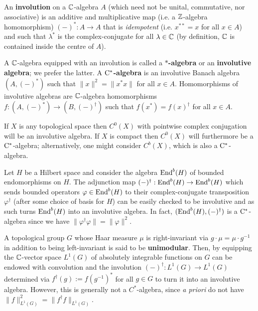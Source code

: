        \begin{definition} \label{def: involutions}
            An \textbf{involution} on a $\mathbb{C}$-algebra $A$ (which need not be unital, commutative, nor associative) is an additive and multiplicative map (i.e. a $\mathbb{Z}$-algebra homomorphism) $(-)^*: A \to A$ that is \textit{idempotent} (i.e. $x^{**} = x$ for all $x \in A$) and such that $\lambda^*$ is the complex-conjugate for all $\lambda \in \mathbb{C}$ (by definition, $\mathbb{C}$ is contained inside the centre of $A$).
            
            A $\mathbb{C}$-algebra equipped with an involution is called a \textbf{$*$-algebra} or an \textbf{involutive algebra}; we prefer the latter. A \textbf{$\mathrm{C}^*$-algebra} is an involutive Banach algebra $(A, (-)^*)$ such that $\|x\|^2 = \|x^* x\|$ for all $x \in A$. Homomorphisms of involutive algebras are $\mathbb{C}$-algebra homomorphisms $f: (A, (-)^*) \to (B, (-)^{\dagger})$ such that $f(x^*) = f(x)^{\dagger}$ for all $x \in A$.
        \end{definition}
        \begin{example} \label{example: continuous_functions_with_complex_conjugation}
            If $X$ is any topological space then $C^0(X)$ with pointwise complex conjugation will be an involutive algebra. If $X$ is compact then $C^0(X)$ will furthermore be a $\mathrm{C}^*$-algebra; alternatively, one might consider $C^b(X)$, which is also a $\mathrm{C}^*$-algebra.
        \end{example}
        \begin{example}
            Let $H$ be a Hilbert space and consider the algebra $\mathrm{End}^b(H)$ of bounded endomorphisms on $H$. The adjunction map $(-)^{\dagger}: \mathrm{End}^b(H) \to \mathrm{End}^b(H)$ which sends bounded operators $\varphi \in \mathrm{End}^b(H)$ to their complex-conjugate transposition $\varphi^{\dagger}$ (after some choice of basis for $H$) can be easily checked to be involutive and as such turns $\mathrm{End}^b(H)$ into an involutive algebra. In fact, $(\mathrm{End}^b(H), (-)^{\dagger})$ is a $\mathrm{C}^*$-algebra since we have $\|\varphi^{\dagger} \varphi\| = \|\varphi\|^2$.
        \end{example}
        \begin{example} 
            A topological group $G$ whose Haar measure $\mu$ is right-invariant via $g \cdot \mu = \mu \cdot g^{-1}$ in addition to being left-invariant is said to be \textbf{unimodular}. Then, by equipping the $\mathbb{C}$-vector space $L^1(G)$ of absolutely integrable functions on $G$ can be endowed with convolution and the involution $(-)^{\dagger}: L^1(G) \to L^1(G)$ determined via $f^{\dagger}(g) := f(g^{-1})^*$ for all $g \in G$ to turn it into an involutive algebra. However, this is generally not a $C^*$-algebra, since \textit{a priori} do not have $\|f\|_{L^1(G)}^2 = \|f^{\dagger} f\|_{L^1(G)}$.
        \end{example}

